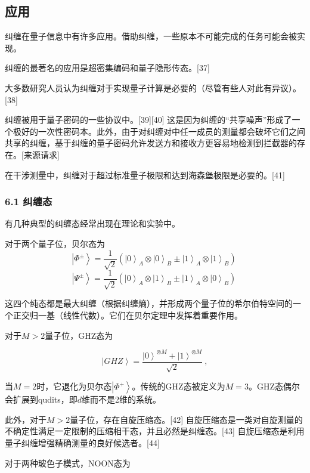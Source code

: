 \subsection{应用}
纠缠在量子信息中有许多应用。借助纠缠，一些原本不可能完成的任务可能会被实现。

纠缠的最著名的应用是超密集编码和量子隐形传态。[37]

大多数研究人员认为纠缠对于实现量子计算是必要的（尽管有些人对此有异议）。[38]

纠缠被用于量子密码的一些协议中。[39][40] 这是因为纠缠的“共享噪声”形成了一个极好的一次性密码本。此外，由于对纠缠对中任一成员的测量都会破坏它们之间共享的纠缠，基于纠缠的量子密码允许发送方和接收方更容易地检测到拦截器的存在。[来源请求]

在干涉测量中，纠缠对于超过标准量子极限和达到海森堡极限是必要的。[41]

\subsubsection{6.1 纠缠态}
有几种典型的纠缠态经常出现在理论和实验中。

对于两个量子位，贝尔态为
$$\left| \Phi^{\pm} \right\rangle = \frac{1}{\sqrt{2}} \left( \left| 0 \right\rangle_A \otimes \left| 0 \right\rangle_B \pm \left| 1 \right\rangle_A \otimes \left| 1 \right\rangle_B \right)~$$
$$\left| \Psi^{\pm} \right\rangle = \frac{1}{\sqrt{2}} \left( \left| 0 \right\rangle_A \otimes \left| 1 \right\rangle_B \pm \left| 1 \right\rangle_A \otimes \left| 0 \right\rangle_B \right)~$$

这四个纯态都是最大纠缠（根据纠缠熵），并形成两个量子位的希尔伯特空间的一个正交归一基（线性代数）。它们在贝尔定理中发挥着重要作用。

对于$M>2$量子位，GHZ态为

$$\left| GHZ \right\rangle = \frac{\left| 0 \right\rangle^{\otimes M} + \left| 1 \right\rangle^{\otimes M}}{\sqrt{2}}~,$$

当$M=2$时，它退化为贝尔态$\left| \Phi^{+} \right\rangle$。传统的GHZ态被定义为$M=3$。GHZ态偶尔会扩展到qudits，即$d$维而不是2维的系统。

此外，对于$M>2$量子位，存在自旋压缩态。[42] 自旋压缩态是一类对自旋测量的不确定性满足一定限制的压缩相干态，并且必然是纠缠态。[43] 自旋压缩态是利用量子纠缠增强精确测量的良好候选者。[44]

对于两种玻色子模式，NOON态为
